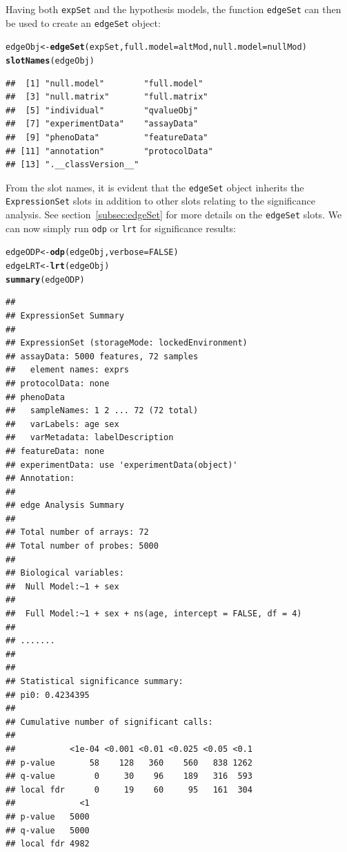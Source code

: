 \documentclass{article}\usepackage[]{graphicx}\usepackage[]{color}
\makeatletter
\newcommand{\hlnum}[1]{\textcolor[rgb]{0.686,0.059,0.569}{#1}}%
\newcommand{\hlstd}[1]{\textcolor[rgb]{0.345,0.345,0.345}{#1}}%
\newcommand{\hlkwb}[1]{\textcolor[rgb]{0.69,0.353,0.396}{#1}}%
\newcommand{\hlkwc}[1]{\textcolor[rgb]{0.333,0.667,0.333}{#1}}%
\newcommand{\hlkwd}[1]{\textcolor[rgb]{0.737,0.353,0.396}{\textbf{#1}}}%
\newenvironment{kframe}{%
 \def\at@end@of@kframe{}%
 \ifinner\ifhmode%
  \def\at@end@of@kframe{\end{minipage}}%
  \begin{minipage}{\columnwidth}%
 \fi\fi%
 \def\FrameCommand##1{\hskip\@totalleftmargin \hskip-\fboxsep
 \colorbox{shadecolor}{##1}\hskip-\fboxsep
     \hskip-\linewidth \hskip-\@totalleftmargin \hskip\columnwidth}%
 \MakeFramed {\advance\hsize-\width
   \@totalleftmargin\z@ \linewidth\hsize
   \@setminipage}}%
 {\par\unskip\endMakeFramed%
 \at@end@of@kframe}
\newenvironment{knitrout}{}{} %
\makeatother
\begin{document}
Having both {\tt expSet} and the hypothesis models, the function {\tt edgeSet} can then be used to create an {\tt edgeSet} object:
\begin{knitrout}
\color{fgcolor}\begin{kframe}
\begin{alltt}
\hlstd{edgeObj} \hlkwb{<-} \hlkwd{edgeSet}\hlstd{(expSet,} \hlkwc{full.model} \hlstd{= altMod,} \hlkwc{null.model} \hlstd{= nullMod)}
\hlkwd{slotNames}\hlstd{(edgeObj)}
\end{alltt}
\begin{verbatim}
##  [1] "null.model"        "full.model"       
##  [3] "null.matrix"       "full.matrix"      
##  [5] "individual"        "qvalueObj"        
##  [7] "experimentData"    "assayData"        
##  [9] "phenoData"         "featureData"      
## [11] "annotation"        "protocolData"     
## [13] ".__classVersion__"
\end{verbatim}
\end{kframe}
\end{knitrout}

From the slot names, it is evident that the {\tt edgeSet} object inherits the {\tt ExpressionSet} slots in addition to other slots relating to the significance analysis. See section~\ref{subsec:edgeSet} for more details on the {\tt edgeSet} slots. We can now simply run {\tt odp} or {\tt lrt} for significance results:
\begin{knitrout}
\color{fgcolor}\begin{kframe}
\begin{alltt}
\hlstd{edgeODP} \hlkwb{<-} \hlkwd{odp}\hlstd{(edgeObj,} \hlkwc{verbose} \hlstd{=} \hlnum{FALSE}\hlstd{)}
\hlstd{edgeLRT} \hlkwb{<-} \hlkwd{lrt}\hlstd{(edgeObj)}
\hlkwd{summary}\hlstd{(edgeODP)}
\end{alltt}
\begin{verbatim}
## 
## ExpressionSet Summary 
##  
## ExpressionSet (storageMode: lockedEnvironment)
## assayData: 5000 features, 72 samples 
##   element names: exprs 
## protocolData: none
## phenoData
##   sampleNames: 1 2 ... 72 (72 total)
##   varLabels: age sex
##   varMetadata: labelDescription
## featureData: none
## experimentData: use 'experimentData(object)'
## Annotation:  
## 
## edge Analysis Summary 
##  
## Total number of arrays: 72 
## Total number of probes: 5000 
##  
## Biological variables: 
## 	Null Model:~1 + sex
## 
## 	Full Model:~1 + sex + ns(age, intercept = FALSE, df = 4)
## 
## ....... 
##  
## 
## Statistical significance summary:
## pi0:	0.4234395	
## 
## Cumulative number of significant calls:
## 
##           <1e-04 <0.001 <0.01 <0.025 <0.05 <0.1
## p-value       58    128   360    560   838 1262
## q-value        0     30    96    189   316  593
## local fdr      0     19    60     95   161  304
##             <1
## p-value   5000
## q-value   5000
## local fdr 4982
\end{verbatim}
\end{kframe}
\end{knitrout}
\end{document}

